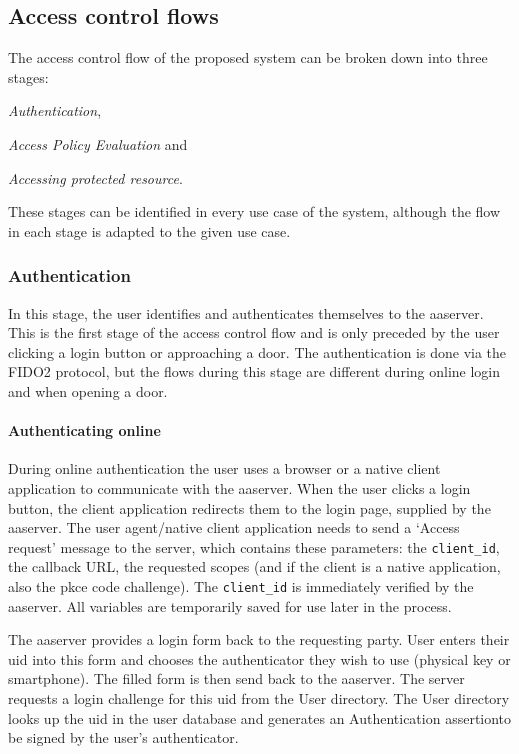 \subsection{Access control flows}

The access control flow of the proposed system can be broken down into three stages:
\begin{enumerate*}[label=(\roman*)]
    \item \textit{Authentication},
    \item \textit{Access Policy Evaluation} and
    \item \textit{Accessing protected resource}.
\end{enumerate*}
These stages can be identified in every use case of the system, although the flow in each stage is adapted to the given use case.

\subsubsection{Authentication}
In this stage, the user identifies and authenticates themselves to the \acrshort{aaserver}. This is the first stage of the access control flow and is only preceded by the user clicking a login button or approaching a door. The authentication is done via the FIDO2 protocol, but the flows during this stage are different during online login and when opening a door.

\paragraph{Authenticating online} During online authentication the user uses a browser or a native client application to communicate with the \acrshort{aaserver}. When the user clicks a login button, the client application redirects them to the login page, supplied by the \acrshort{aaserver}. The user agent/native client application needs to send a `Access request' message to the server, which contains these parameters: the \texttt{client\_id}, the callback URL, the requested scopes (and if the client is a native application, also the \acrshort{pkce} code challenge). The \texttt{client\_id} is immediately verified by the \acrshort{aaserver}. All variables are temporarily saved for use later in the process. 

The \acrshort{aaserver} provides a login form back to the requesting party. User enters their \acrshort{uid} into this form and chooses the authenticator they wish to use (physical key or smartphone). The filled form is then send back to the \acrshort{aaserver}. The server requests a login challenge for this \acrshort{uid} from the User directory. The User directory looks up the \acrshort{uid} in the user database and generates an Authentication assertion\footnotemark to be signed by the user's authenticator.
% 

